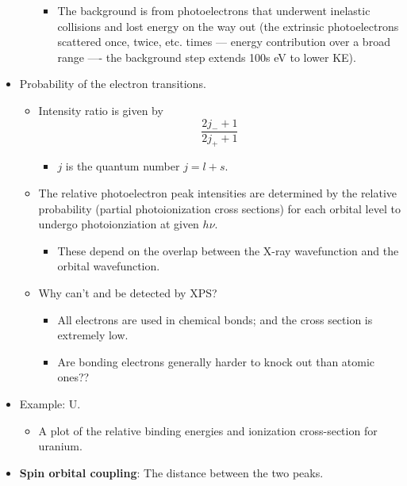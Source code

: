 \documentclass[../notes.tex]{subfiles}
\begin{document}
\begin{itemize}
\begin{itemize}
\begin{itemize}
            \item The background is from photoelectrons that underwent inelastic collisions and lost energy on the way out (the extrinsic photoelectrons scattered once, twice, etc. times --- energy contribution over a broad range ---- the background step extends 100s eV to lower KE).
        \end{itemize}
    \end{itemize}
    \item Probability of the electron transitions.
    \begin{itemize}
        \item Intensity ratio is given by
        \begin{equation*}
            \frac{2j_-+1}{2j_++1}
        \end{equation*}
        \begin{itemize}
            \item $j$ is the quantum number $j=l+s$.
        \end{itemize}
        \item The relative photoelectron peak intensities are determined by the relative probability (partial photoionization cross sections) for each orbital level to undergo photoionziation at given $h\nu$.
        \begin{itemize}
            \item These depend on the overlap between the X-ray wavefunction and the orbital wavefunction.
        \end{itemize}
        \item Why can't  and  be detected by XPS?
        \begin{itemize}
            \item All electrons are used in chemical bonds; and the cross section is extremely low.
            \item Are bonding electrons generally harder to knock out than atomic ones??
        \end{itemize}
    \end{itemize}
    \item Example: U.
    \begin{itemize}
        \item A plot of the relative binding energies and ionization cross-section for uranium.
    \end{itemize}
    \item \textbf{Spin orbital coupling}: The distance between the two peaks.
    \begin{itemize}

\end{itemize}
\end{itemize}
\end{document}
